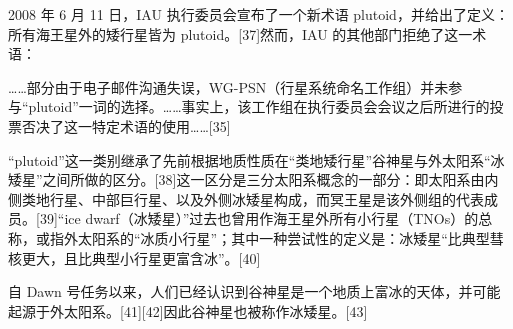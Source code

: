 2008 年 6 月 11 日，IAU 执行委员会宣布了一个新术语 plutoid，并给出了定义：所有海王星外的矮行星皆为 plutoid。[37]然而，IAU 的其他部门拒绝了这一术语：

……部分由于电子邮件沟通失误，WG-PSN（行星系统命名工作组）并未参与“plutoid”一词的选择。……事实上，该工作组在执行委员会会议之后所进行的投票否决了这一特定术语的使用……[35]

“plutoid”这一类别继承了先前根据地质性质在“类地矮行星”谷神星与外太阳系“冰矮星”之间所做的区分。[38]这一区分是三分太阳系概念的一部分：即太阳系由内侧类地行星、中部巨行星、以及外侧冰矮星构成，而冥王星是该外侧组的代表成员。[39]“ice dwarf（冰矮星）”过去也曾用作海王星外所有小行星（TNOs）的总称，或指外太阳系的“冰质小行星”；其中一种尝试性的定义是：冰矮星“比典型彗核更大，且比典型小行星更富含冰”。[40]

自 Dawn 号任务以来，人们已经认识到谷神星是一个地质上富冰的天体，并可能起源于外太阳系。[41][42]因此谷神星也被称作冰矮星。[43]







